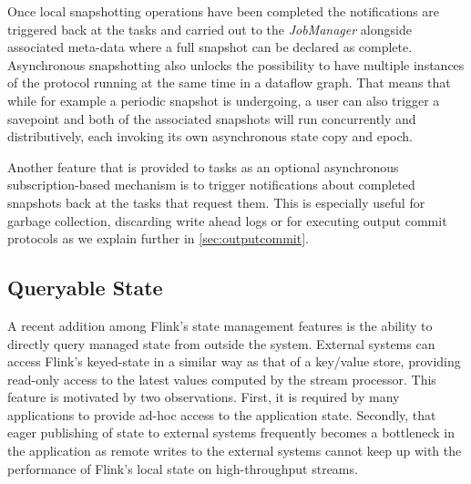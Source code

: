 Once local snapshotting operations have been completed the notifications are triggered back at the tasks and carried out to the \emph{JobManager} alongside associated meta-data where a full snapshot can be declared as complete. Asynchronous snapshotting also unlocks the possibility to have multiple instances of the protocol running at the same time in a dataflow graph.  That means that while for example a periodic snapshot is undergoing, a user can also trigger a savepoint and both of the associated snapshots will run concurrently and distributively, each invoking its own asynchronous state copy and epoch.

Another feature that is provided to tasks as an optional asynchronous subscription-based mechanism is to trigger notifications about completed snapshots back at the tasks that request them. This is especially useful for garbage collection, discarding write ahead logs or for executing output commit protocols as we explain further in \autoref{sec:outputcommit}.

\subsection{Queryable State}

A recent addition among Flink's state management features is the ability to directly query managed state from outside the system. External systems can access Flink's keyed-state in a similar way as that of a key/value store, providing read-only access to the latest values computed by the stream processor. This feature is motivated by two observations. First, it is required by many applications to provide ad-hoc access to the application state. Secondly, that eager publishing of state to external systems frequently becomes a bottleneck in the application as remote writes to the external systems cannot keep up with the performance of Flink's local state on high-throughput streams.

